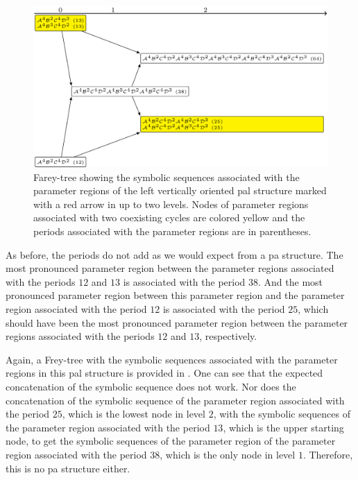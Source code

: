 \begin{figure}
	\centering
	\includegraphics[width=.7 \textwidth]{../Figures/7/7.15+17/adding.png}
	\caption[Farey-tree showing the symbolic sequences associated with the parameter regions of a vertically oriented  structure]{
		Farey-tree showing the symbolic sequences associated with the parameter regions of the left vertically oriented \gls{pal} structure marked with a red arrow in  up to two levels.
		Nodes of parameter regions associated with two coexisting cycles are colored yellow and the periods associated with the parameter regions are in parentheses.
	}
	\label{fig:add.add.like.vert.tree}
\end{figure}

As before, the periods do not add as we would expect from a \gls{pa} structure.
The most pronounced parameter region between the parameter regions associated with the periods $12$ and $13$ is associated with the period $38$.
And the most pronounced parameter region between this parameter region and the parameter region associated with the period $12$ is associated with the period $25$, which should have been the most pronounced parameter region between the parameter regions associated with the periods $12$ and $13$, respectively.

Again, a Frey-tree with the symbolic sequences associated with the parameter regions in this \gls{pal} structure is provided in .
One can see that the expected concatenation of the symbolic sequence does not work.
Nor does the concatenation of the symbolic sequence of the parameter region associated with the period $25$, which is the lowest node in level $2$, with the symbolic sequences of the parameter region associated with the period $13$, which is the upper starting node, to get the symbolic sequences of the parameter region of the parameter region associated with the period $38$, which is the only node in level $1$.
Therefore, this is no \gls{pa} structure either.

